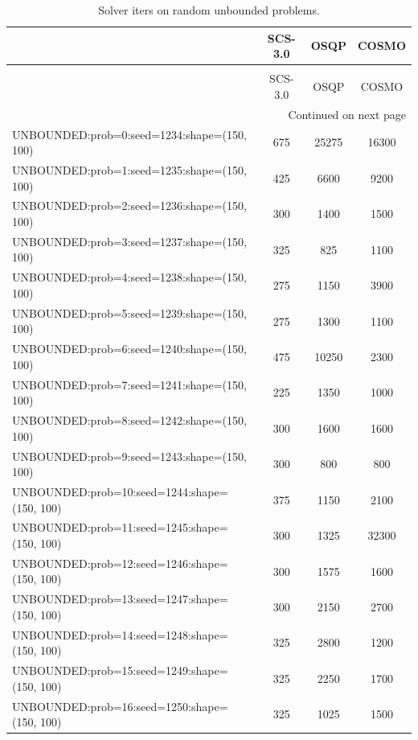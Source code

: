 \begin{longtable}{lccc}
\caption{Solver iters on random unbounded problems.}
\label{t-random unbounded-iters}\\
\toprule
{} &  SCS-3.0 &  OSQP &  COSMO \\
\midrule
\endfirsthead
\caption[]{Solver iters on random unbounded problems.} \\
\toprule
{} &  SCS-3.0 &  OSQP &  COSMO \\
\midrule
\endhead
\midrule
\multicolumn{4}{r}{{Continued on next page}} \\
\midrule
\endfoot

\bottomrule
\endlastfoot
UNBOUNDED:prob=0:seed=1234:shape=(150, 100)   &      675 & 25275 &  16300 \\
UNBOUNDED:prob=1:seed=1235:shape=(150, 100)   &      425 &  6600 &   9200 \\
UNBOUNDED:prob=2:seed=1236:shape=(150, 100)   &      300 &  1400 &   1500 \\
UNBOUNDED:prob=3:seed=1237:shape=(150, 100)   &      325 &   825 &   1100 \\
UNBOUNDED:prob=4:seed=1238:shape=(150, 100)   &      275 &  1150 &   3900 \\
UNBOUNDED:prob=5:seed=1239:shape=(150, 100)   &      275 &  1300 &   1100 \\
UNBOUNDED:prob=6:seed=1240:shape=(150, 100)   &      475 & 10250 &   2300 \\
UNBOUNDED:prob=7:seed=1241:shape=(150, 100)   &      225 &  1350 &   1000 \\
UNBOUNDED:prob=8:seed=1242:shape=(150, 100)   &      300 &  1600 &   1600 \\
UNBOUNDED:prob=9:seed=1243:shape=(150, 100)   &      300 &   800 &    800 \\
UNBOUNDED:prob=10:seed=1244:shape=(150, 100)  &      375 &  1150 &   2100 \\
UNBOUNDED:prob=11:seed=1245:shape=(150, 100)  &      300 &  1325 &  32300 \\
UNBOUNDED:prob=12:seed=1246:shape=(150, 100)  &      300 &  1575 &   1600 \\
UNBOUNDED:prob=13:seed=1247:shape=(150, 100)  &      300 &  2150 &   2700 \\
UNBOUNDED:prob=14:seed=1248:shape=(150, 100)  &      325 &  2800 &   1200 \\
UNBOUNDED:prob=15:seed=1249:shape=(150, 100)  &      325 &  2250 &   1700 \\
UNBOUNDED:prob=16:seed=1250:shape=(150, 100)  &      325 &  1025 &   1500 \\

\end{longtable}
